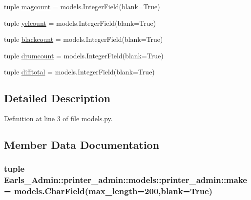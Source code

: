 \begin{CompactItemize}
\item 
tuple \hyperlink{classEarls__Admin_1_1printer__admin_1_1models_1_1printer__admin_f7ebc1178ac487df8793da6a4dc45f1c}{magcount} = models.IntegerField(blank=True)
\item 
tuple \hyperlink{classEarls__Admin_1_1printer__admin_1_1models_1_1printer__admin_cd575b8e33c580feda59ce2150cade37}{yelcount} = models.IntegerField(blank=True)
\item 
tuple \hyperlink{classEarls__Admin_1_1printer__admin_1_1models_1_1printer__admin_c954cda354eee56c8f52f9eccbb399a7}{blackcount} = models.IntegerField(blank=True)
\item 
tuple \hyperlink{classEarls__Admin_1_1printer__admin_1_1models_1_1printer__admin_678494b47a45fe045e2d64e3ab6bdffb}{drumcount} = models.IntegerField(blank=True)
\item 
tuple \hyperlink{classEarls__Admin_1_1printer__admin_1_1models_1_1printer__admin_fbceac6bc0d804e01ae841ad8f0ab8f8}{difftotal} = models.IntegerField(blank=True)
\end{CompactItemize}


\subsection{Detailed Description}


Definition at line 3 of file models.py.

\subsection{Member Data Documentation}
\hypertarget{classEarls__Admin_1_1printer__admin_1_1models_1_1printer__admin_138a14c53aba41a662f01ee10665aee6}{
\subsubsection[make]{\setlength{\rightskip}{0pt plus 5cm}tuple {\bf Earls\_\-Admin::printer\_\-admin::models::printer\_\-admin::make} = models.CharField(max\_\-length=200,blank=True)}}
\label{classEarls__Admin_1_1printer__admin_1_1models_1_1printer__admin_138a14c53aba41a662f01ee10665aee6}




